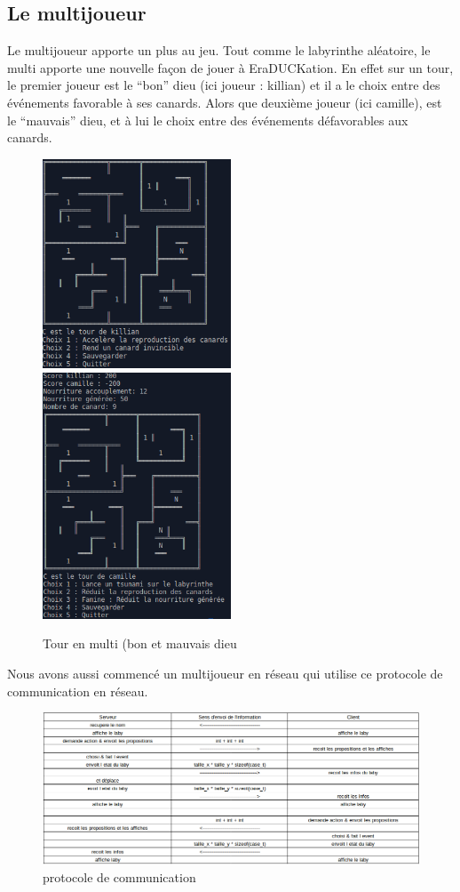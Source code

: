 \documentclass[12pt,a4paper,twoside]{article}
\begin{document}
\subsection{Le multijoueur}
Le multijoueur apporte un plus au jeu. Tout comme le labyrinthe aléatoire, le multi
apporte une nouvelle façon de jouer à EraDUCKation. En effet sur un tour, le premier joueur est le “bon” dieu (ici joueur : killian) et il a le choix entre des événements favorable à ses canards. Alors que deuxième joueur (ici camille), est le “mauvais” dieu, et à lui le choix entre des événements défavorables aux canards.
\begin{figure}[h]
\includegraphics[width=0.5\textwidth]{IMG/tour_kiki.png}
\includegraphics[width=0.5\textwidth]{IMG/tour_cam.png}
\caption{Tour en multi (bon et mauvais dieu}
\end{figure}

Nous avons aussi commencé un multijoueur en réseau qui utilise ce protocole de communication en réseau.
\begin{figure}[h]
\centering
\includegraphics[width=1\textwidth]{IMG/reseau.png}
\caption{protocole de communication}
\end{figure}
\newpage
\end{document}
